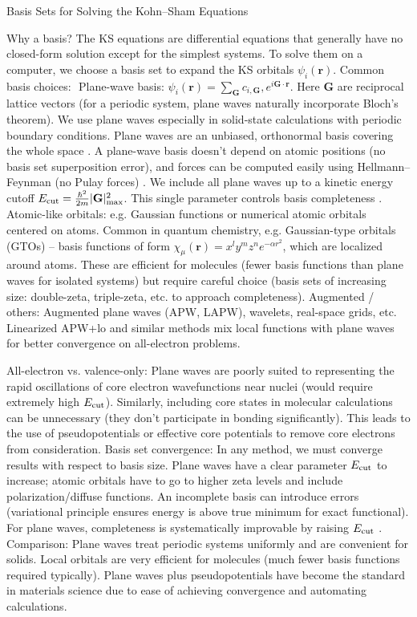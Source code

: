 \begin{frame}{Basis Sets for Solving the Kohn–Sham Equations}

Why a basis? The KS equations are differential equations that generally have no closed-form solution except for the simplest systems. To solve them on a computer, we choose a basis set to expand the KS orbitals $\psi_i(\mathbf{r})$. Common basis choices: 
Plane-wave basis: $\displaystyle \psi_i(\mathbf{r}) = \sum_{\mathbf{G}} c_{i,\mathbf{G}}, e^{i\mathbf{G}\cdot \mathbf{r}}$. Here $\mathbf{G}$ are reciprocal lattice vectors (for a periodic system, plane waves naturally incorporate Bloch’s theorem). We use plane waves especially in solid-state calculations with periodic boundary conditions. Plane waves are an unbiased, orthonormal basis covering the whole space  . A plane-wave basis doesn’t depend on atomic positions (no basis set superposition error), and forces can be computed easily using Hellmann–Feynman (no Pulay forces) . We include all plane waves up to a kinetic energy cutoff $E_{\rm cut} = \frac{\hbar^2}{2m}|\mathbf{G}|^2_{\max}$. This single parameter controls basis completeness .
Atomic-like orbitals: e.g. Gaussian functions or numerical atomic orbitals centered on atoms. Common in quantum chemistry, e.g. Gaussian-type orbitals (GTOs) – basis functions of form $\chi_{\mu}(\mathbf{r}) = x^l y^m z^n e^{-\alpha r^2}$, which are localized around atoms. These are efficient for molecules (fewer basis functions than plane waves for isolated systems) but require careful choice (basis sets of increasing size: double-zeta, triple-zeta, etc. to approach completeness).
Augmented / others: Augmented plane waves (APW, LAPW), wavelets, real-space grids, etc. Linearized APW+lo and similar methods mix local functions with plane waves for better convergence on all-electron problems.

All-electron vs. valence-only: Plane waves are poorly suited to representing the rapid oscillations of core electron wavefunctions near nuclei (would require extremely high $E_{\rm cut}$). Similarly, including core states in molecular calculations can be unnecessary (they don’t participate in bonding significantly). This leads to the use of pseudopotentials or effective core potentials to remove core electrons from consideration.
Basis set convergence: In any method, we must converge results with respect to basis size. Plane waves have a clear parameter $E_{\rm cut}$ to increase; atomic orbitals have to go to higher zeta levels and include polarization/diffuse functions. An incomplete basis can introduce errors (variational principle ensures energy is above true minimum for exact functional). For plane waves, completeness is systematically improvable by raising $E_{\rm cut}$ .
Comparison: Plane waves treat periodic systems uniformly and are convenient for solids. Local orbitals are very efficient for molecules (much fewer basis functions required typically). Plane waves plus pseudopotentials have become the standard in materials science due to ease of achieving convergence and automating calculations. \end{frame}


